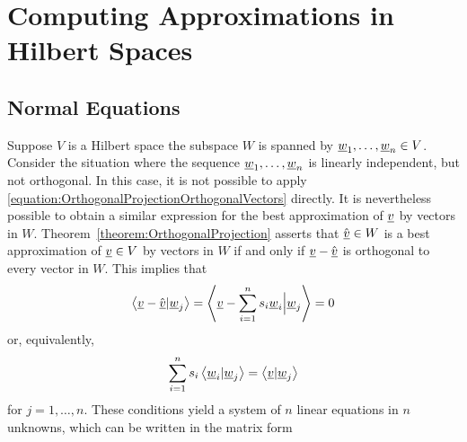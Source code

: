 \section{Computing Approximations in Hilbert Spaces}

\subsection{Normal Equations}

Suppose $V$ is a Hilbert space the subspace $W$ is spanned by $\underline{w}_1, \ldots, \underline{w}_n \in V$.
Consider the situation where the sequence $\underline{w}_1, \ldots, \underline{w}_n$ is linearly independent, but not orthogonal.
In this case, it is not possible to apply \eqref{equation:OrthogonalProjectionOrthogonalVectors} directly.
It is nevertheless possible to obtain a similar expression for the best approximation of $\underline{v}$ by vectors in $W$.
Theorem~\ref{theorem:OrthogonalProjection} asserts that $\hat{\underline{v}} \in W$ is a best approximation of $\underline{v} \in V$ by vectors in $W$ if and only if $\underline{v} - \hat{\underline{v}}$ is orthogonal to every vector in $W$.
This implies that
\begin{equation*}
\left\langle \underline{v} - \hat{\underline{v}} | \underline{w}_j \right\rangle
= \left\langle \underline{v} - \sum_{i=1}^n s_i \underline{w}_i \Big| \underline{w}_j \right\rangle
= 0
\end{equation*}
or, equivalently,
\begin{equation*}
\sum_{i=1}^n s_i \left\langle \underline{w}_i | \underline{w}_j \right\rangle
= \left\langle \underline{v} | \underline{w}_j \right\rangle
\end{equation*}
for $j = 1, \ldots, n$.
These conditions yield a system of $n$ linear equations in $n$ unknowns, which can be written in the matrix form
